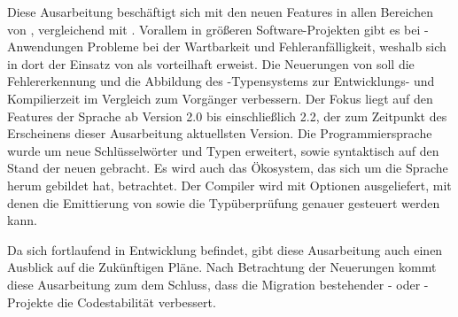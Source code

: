 Diese Ausarbeitung beschäftigt sich mit den neuen Features in allen Bereichen von , vergleichend mit . Vorallem in größeren Software-Projekten gibt es bei \js-Anwendungen Probleme bei der Wartbarkeit und Fehleranfälligkeit, weshalb sich in dort der Einsatz von \ts als vorteilhaft erweist. Die Neuerungen von \ts soll die Fehlererkennung und die Abbildung des \js-Typensystems zur Entwicklungs- und Kompilierzeit im Vergleich zum Vorgänger verbessern.  Der Fokus liegt auf den Features der Sprache ab Version 2.0 bis einschließlich 2.2, der zum Zeitpunkt des Erscheinens dieser Ausarbeitung aktuellsten Version. Die Programmiersprache wurde um neue Schlüsselwörter und Typen erweitert, sowie syntaktisch auf den Stand der neuen \esss gebracht. Es wird auch das Ökosystem, das sich um die Sprache herum gebildet hat, betrachtet. Der Compiler wird mit Optionen ausgeliefert, mit denen die Emittierung von \js sowie die Typüberprüfung genauer gesteuert werden kann.

Da sich \ts fortlaufend in Entwicklung befindet, gibt diese Ausarbeitung auch einen Ausblick auf die Zukünftigen Pläne.
Nach Betrachtung der Neuerungen kommt diese Ausarbeitung zum dem Schluss, dass die Migration bestehender \js- oder \ts-Projekte die Codestabilität verbessert.